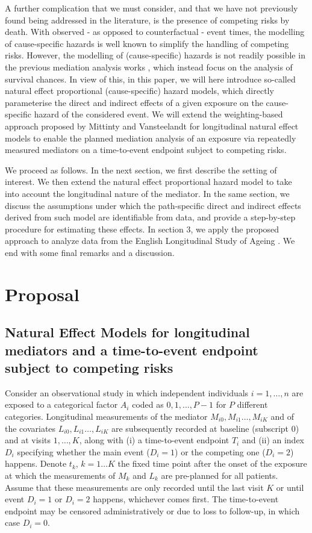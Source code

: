 \documentclass[AMA,STIX1COL]{WileyNJD-v2}
\begin{document}
A further complication that we must consider, and that we have not previously found being addressed in the literature, is the presence of competing risks by death. With observed - as opposed to counterfactual - event times, the modelling of cause-specific hazards is well known to simplify the handling of competing risks. However, the modelling of (cause-specific) hazards is not readily possible in the previous mediation analysis works \citep{zheng2017longitudinal,lin17,vansteelandt19}, which instead focus on the analysis of survival chances. In view of this, in this paper, we will here introduce so-called natural effect proportional (cause-specific) hazard models, which directly parameterise the direct and indirect effects of a given exposure on the cause-specific hazard of the considered event. We will extend the weighting-based approach proposed by Mittinty and Vansteelandt \citep{mittinty2019longitudinal} for longitudinal natural effect models to enable the planned mediation analysis of an exposure via repeatedly measured mediators on a time-to-event endpoint subject to competing risks.

We proceed as follows. In the next section, we first describe the setting of interest. We then extend the natural effect proportional hazard model to take into account the longitudinal nature of the mediator. In the same section, we discuss the assumptions under which the path-specific direct and indirect effects derived from such model are identifiable from data, and provide a step-by-step procedure for estimating these effects. In section 3, we apply the proposed approach to analyze data from the English Longitudinal Study of Ageing \citep{steptoe2013cohort, davies2017}. We end with some final remarks and a discussion. 

\section{Proposal}\label{sec2}
\subsection{Natural Effect Models for longitudinal mediators and a time-to-event endpoint subject to competing risks}
Consider an observational study in which independent individuals $i = 1, \ldots, n$ are exposed to a categorical factor $A_i$ coded as $0, 1,\ldots, P-1$ for $P$ different categories. Longitudinal measurements of the mediator $M_{i0},M_{i1}\ldots, M_{iK}$ and of the covariates $L_{i0},L_{i1}\ldots, L_{iK}$ are subsequently recorded at baseline (subscript 0) and at visits $1, \ldots, K$, along with (i) a time-to-event endpoint $T_i$ and (ii) an index $D_i$ specifying whether the main event ($D_i = 1$) or the competing one ($D_i = 2$) happens. Denote $t_k$, $k = 1\ldots K$ the fixed time point after the onset of the exposure at which the measurements of $M_k$ and $L_k$ are pre-planned for all patients.  Assume that these measurements are only recorded until the last visit $K$ or until event $D_i = 1$ or $D_i = 2$ happens, whichever comes first. The time-to-event endpoint may be censored administratively or due to loss to follow-up, in which case $D_i = 0$.
\end{document}
